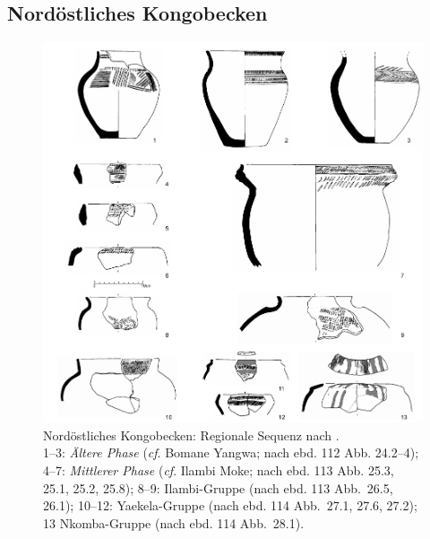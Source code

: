 \subsection{Nordöstliches Kongobecken}\label{sec:NordCongo}

\begin{figure}[!tb]
	\centering
	\includegraphics[width = \textwidth]{fig/neCongo_Typen.pdf}
	\caption{Nordöstliches Kongobecken: Regionale Sequenz nach \textcite{LivingstoneSmith.2017}.\\ 1--3: \textit{Ältere Phase} (\textit{cf}. Bomane Yangwa; nach ebd. 112 Abb. 24.2--4); 4--7: \textit{Mittlerer Phase} (\textit{cf}. Ilambi Moke; nach ebd. 113 Abb. 25.3, 25.1, 25.2, 25.8); 8--9: Ilambi-Gruppe (nach ebd. 113 Abb.~26.5, 26.1); 10--12: Yaekela-Gruppe (nach ebd. 114 Abb.~27.1, 27.6, 27.2); 13 Nkomba-Gruppe (nach ebd. 114 Abb.~28.1).}
	\label{fig:LivingstoneSmith2017_noCongoTrad}
\end{figure}

